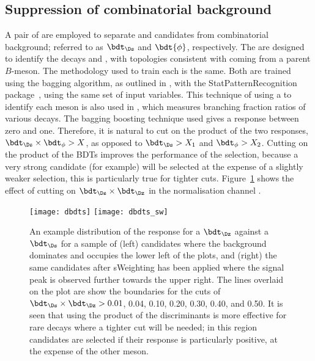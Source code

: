 \subsection{Suppression of combinatorial background}
A pair of  are employed to
separate \dstokkpi and \phitokk candidates from combinatorial background; referred to as
$\bdt_{\Ds}$ and $\bdt{\phi}$, respectively.
The  are designed to identify the
decays \dstokkpi and \phitokk, with topologies consistent with coming from a parent $B$-meson.
The methodology used to train each \bdt is the same.
Both are trained using the bagging algorithm, as outlined in , with the
StatPatternRecognition package~\cite{Narsky:2005xpa}, using the same set of
input variables.
This technique of using a \bdt to identify each meson is also used in
, which measures branching fraction ratios of various  decays.
The bagging boosting technique used gives
a response between zero and one.
Therefore, it is natural to cut on the product of the two \BDT responses,
$\bdt_{\Ds}\times\bdt_\phi>X$, as opposed to $\bdt_{\Ds}>X_1$ and $\bdt_\phi>X_2$.
Cutting on the product of the \glspl{BDT} improves the performance of the selection, because a
very strong \Ds candidate (for example) will be selected at the expense of a slightly weaker \phii
selection, this is particularly true for tighter cuts.
Figure~\ref{fig:dsphi:bdtprod} shows the effect of cutting on $\bdt_{\Ds}\times\bdt_{\Dz}$ in the
normalisation channel \btodsd.

\begin{figure}
  \begin{center}
    \texttt{[image: dbdts]}
    \texttt{[image: dbdts\_sw]}
    \caption[Example distribution of $\mathrm{BDT}_{D_s^+}\times\mathrm{BDT}_{D^0}$ from candidates
      for the decay \btodsd]
    {
      An example distribution of the response for a $\bdt_{\Dz}$ against a $\bdt_{\Ds}$ for a
      sample of (left) \btodsd candidates where the background dominates and occupies the lower
      left of the plots, and (right) the same candidates after sWeighting has been applied where
      the signal peak is observed further towards the upper right.
      The lines overlaid on the plot are show the boundaries for the cuts of
      $\bdt_{\Ds}\times\bdt_{\Dz}>0.01$, 0.04, 0.10, 0.20, 0.30, 0.40, and 0.50.
      It is seen that using the product of the \bdt discriminants is more effective for rare decays
      where a tighter cut will be needed; in this region candidates are selected if their response
      is particularly positive, at the expense of the other meson.
    }
    \label{fig:dsphi:bdtprod}
  \end{center}
\end{figure}

